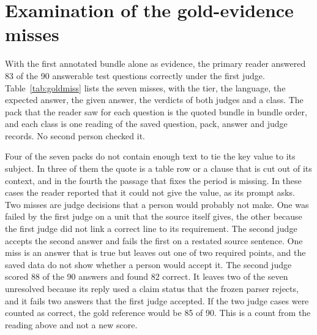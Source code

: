 \documentclass[preprint,12pt]{elsarticle}
\begin{document}
\section{Examination of the gold-evidence misses}
\label{supp:goldmiss}
With the first annotated bundle alone as evidence, the primary reader answered 83 of the 90 answerable test questions correctly under the first judge. Table~\ref{tab:goldmiss} lists the seven misses, with the tier, the language, the expected answer, the given answer, the verdicts of both judges and a class. The pack that the reader saw for each question is the quoted bundle in bundle order, and each class is one reading of the saved question, pack, answer and judge records. No second person checked it.

Four of the seven packs do not contain enough text to tie the key value to its subject. In three of them the quote is a table row or a clause that is cut out of its context, and in the fourth the passage that fixes the period is missing. In these cases the reader reported that it could not give the value, as its prompt asks. Two misses are judge decisions that a person would probably not make. One was failed by the first judge on a unit that the source itself gives, the other because the first judge did not link a correct line to its requirement. The second judge accepts the second answer and fails the first on a restated source sentence. One miss is an answer that is true but leaves out one of two required points, and the saved data do not show whether a person would accept it.
The second judge scored 88 of the 90 answers and found 82 correct. It leaves two of the seven unresolved because its reply used a claim status that the frozen parser rejects, and it fails two answers that the first judge accepted. If the two judge cases were counted as correct, the gold reference would be 85 of 90. This is a count from the reading above and not a new score.


\FloatBarrier


\end{document}
